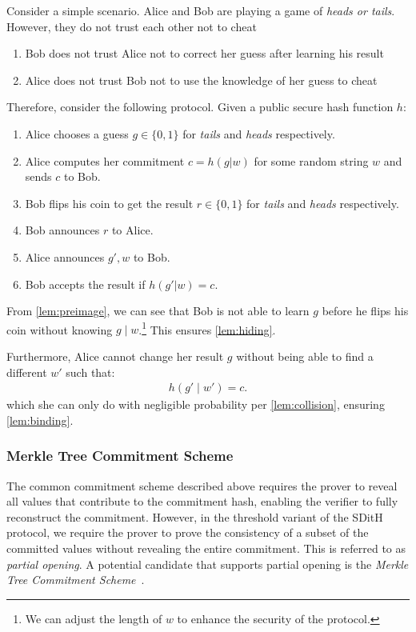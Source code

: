 \documentclass[11pt]{report}
\theoremstyle{definition}
\theoremstyle{plain}
\begin{document}
Consider a simple scenario. Alice and Bob are playing a game of \textit{heads or tails}. However, they do not trust each other not to cheat
\begin{enumerate}[parsep=0pt, itemsep=0pt]
  \item Bob does not trust Alice not to correct her guess after learning his result
  \item Alice does not trust Bob not to use the knowledge of her guess to cheat
\end{enumerate}
Therefore, consider the following protocol. Given a public secure hash function $h$:
\begin{enumerate}[parsep=0pt, itemsep=0pt]
  \item Alice chooses a guess $g \in \{0,1\}$ for \textit{tails} and \textit{heads} respectively.
  \item Alice computes her commitment $c = h(g | w)$ for some random string $w$ and sends $c$ to Bob.
  \item Bob flips his coin to get the result $r \in \{0,1\}$ for \textit{tails} and \textit{heads} respectively.
  \item Bob announces $r$ to Alice.
  \item Alice announces $g', w$ to Bob.
  \item Bob accepts the result if $h(g' | w) = c$.
\end{enumerate}

From \autoref{lem:preimage}, we can see that Bob is not able to learn $g$ before he flips his coin without knowing $g \mid w$.\footnote{We can adjust the length of $w$ to enhance the security of the protocol.} This ensures \autoref{lem:hiding}.

Furthermore, Alice cannot change her result $g$ without being able to find a different $w'$ such that:
\begin{align*}
  h(g' \mid w') = c.
\end{align*}
which she can only do with negligible probability per \autoref{lem:collision}, ensuring \autoref{lem:binding}.

\subsubsection{Merkle Tree Commitment Scheme}
\label{sub:merkle_tree_prelim}
The common commitment scheme described above requires the prover to reveal all values that contribute to the commitment hash, enabling the verifier to fully reconstruct the commitment. However, in the threshold variant of the SDitH protocol, we require the prover to prove the consistency of a subset of the committed values without revealing the entire commitment. This is referred to as \textit{partial opening}. A potential candidate that supports partial opening is the \textit{Merkle Tree Commitment Scheme}~\cite{becker2008merkle}.
\end{document}
